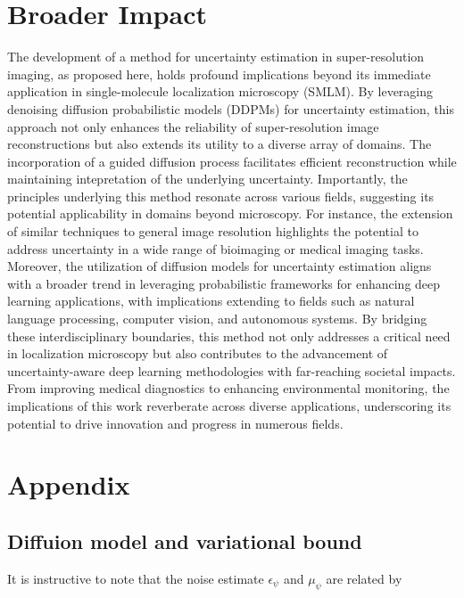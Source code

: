 \documentclass{article}
\begin{document}
\section{Broader Impact}

The development of a method for uncertainty estimation in super-resolution imaging, as proposed here, holds profound implications beyond its immediate application in single-molecule localization microscopy (SMLM). By leveraging denoising diffusion probabilistic models (DDPMs) for uncertainty estimation, this approach not only enhances the reliability of super-resolution image reconstructions but also extends its utility to a diverse array of domains. The incorporation of a guided diffusion process facilitates efficient reconstruction while maintaining intepretation of the underlying uncertainty. Importantly, the principles underlying this method resonate across various fields, suggesting its potential applicability in domains beyond microscopy. For instance, the extension of similar techniques to general image resolution highlights the potential to address uncertainty in a wide range of bioimaging or medical imaging tasks. Moreover, the utilization of diffusion models for uncertainty estimation aligns with a broader trend in leveraging probabilistic frameworks for enhancing deep learning applications, with implications extending to fields such as natural language processing, computer vision, and autonomous systems. By bridging these interdisciplinary boundaries, this method not only addresses a critical need in localization microscopy but also contributes to the advancement of uncertainty-aware deep learning methodologies with far-reaching societal impacts. From improving medical diagnostics to enhancing environmental monitoring, the implications of this work reverberate across diverse applications, underscoring its potential to drive innovation and progress in numerous fields.



 


\appendix

\section{Appendix}

\subsection{Diffuion model and variational bound}

It is instructive to note that the noise estimate $\epsilon_{\psi}$ and $\mu_{\psi}$ are related by \citep{Saharia2021}
\end{document}

